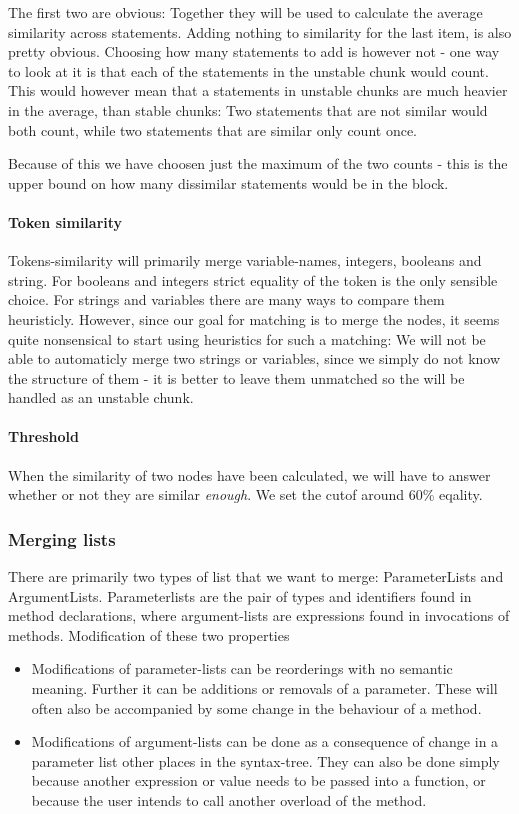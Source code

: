 \documentclass[11pt]{article}
\begin{document}
The first two are obvious: Together they will be used to calculate the average similarity across statements. Adding nothing to similarity for the last item, is also pretty obvious. Choosing how many statements to add is however not - one way to look at it is that each of the statements in the unstable chunk would count. This would however mean that a statements in unstable chunks are much heavier in the average, than stable chunks: Two statements that are not similar would both count, while two statements that are similar only count once.

Because of this we have choosen just the maximum of the two counts - this is the upper bound on how many dissimilar statements would be in the block.

\paragraph{Token similarity} Tokens-similarity will primarily merge variable-names, integers, booleans and string. For booleans and integers strict equality of the token is the only sensible choice. For strings and variables there are many ways to compare them heuristicly. However, since our goal for matching is to merge the nodes, it seems quite nonsensical to start using heuristics for such a matching: We will not be able to automaticly merge two strings or variables, since we simply do not know the structure of them - it is better to leave them unmatched so the will be handled as an unstable chunk.

\paragraph{Threshold} When the similarity of two nodes have been calculated, we will have to answer whether or not they are similar \textit{enough}. We set the cutof around 60\% eqality.


\subsubsection{Merging lists}
There are primarily two types of list that we want to merge: ParameterLists and ArgumentLists. Parameterlists are the pair of types and identifiers found in method declarations, where argument-lists are expressions found in invocations of methods. Modification of these two properties 

\begin{itemize}
   \item Modifications of parameter-lists can be reorderings with no semantic meaning. Further it can be additions or removals of a parameter. These will often also be accompanied by some change in the behaviour of a method.
   \item Modifications of argument-lists can be done as a consequence of change in a parameter list other places in the syntax-tree. They can also be done simply because another expression or value needs to be passed into a function, or because the user intends to call another overload of the method.
\end{itemize}
\end{document}

